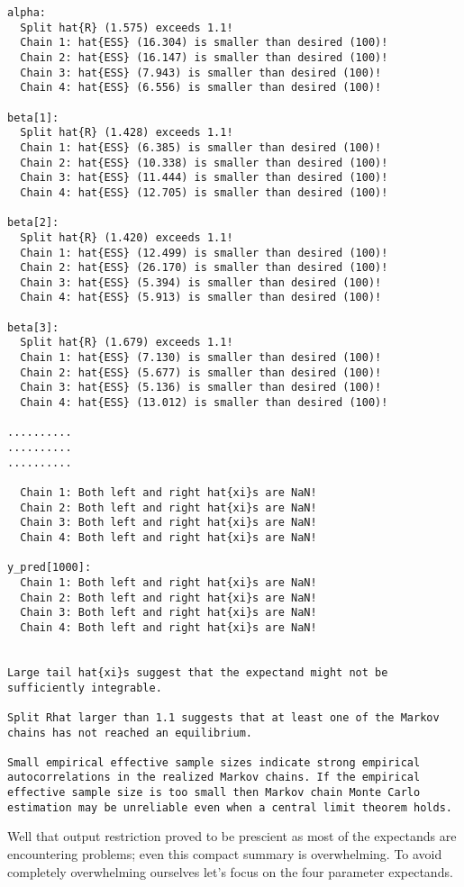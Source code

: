 \documentclass[
  letterpaper,
  DIV=11,
  numbers=noendperiod]{scrartcl}
\begin{document}
\begin{verbatim}
alpha:
  Split hat{R} (1.575) exceeds 1.1!
  Chain 1: hat{ESS} (16.304) is smaller than desired (100)!
  Chain 2: hat{ESS} (16.147) is smaller than desired (100)!
  Chain 3: hat{ESS} (7.943) is smaller than desired (100)!
  Chain 4: hat{ESS} (6.556) is smaller than desired (100)!

beta[1]:
  Split hat{R} (1.428) exceeds 1.1!
  Chain 1: hat{ESS} (6.385) is smaller than desired (100)!
  Chain 2: hat{ESS} (10.338) is smaller than desired (100)!
  Chain 3: hat{ESS} (11.444) is smaller than desired (100)!
  Chain 4: hat{ESS} (12.705) is smaller than desired (100)!

beta[2]:
  Split hat{R} (1.420) exceeds 1.1!
  Chain 1: hat{ESS} (12.499) is smaller than desired (100)!
  Chain 2: hat{ESS} (26.170) is smaller than desired (100)!
  Chain 3: hat{ESS} (5.394) is smaller than desired (100)!
  Chain 4: hat{ESS} (5.913) is smaller than desired (100)!

beta[3]:
  Split hat{R} (1.679) exceeds 1.1!
  Chain 1: hat{ESS} (7.130) is smaller than desired (100)!
  Chain 2: hat{ESS} (5.677) is smaller than desired (100)!
  Chain 3: hat{ESS} (5.136) is smaller than desired (100)!
  Chain 4: hat{ESS} (13.012) is smaller than desired (100)!

..........
..........
..........

  Chain 1: Both left and right hat{xi}s are NaN!
  Chain 2: Both left and right hat{xi}s are NaN!
  Chain 3: Both left and right hat{xi}s are NaN!
  Chain 4: Both left and right hat{xi}s are NaN!

y_pred[1000]:
  Chain 1: Both left and right hat{xi}s are NaN!
  Chain 2: Both left and right hat{xi}s are NaN!
  Chain 3: Both left and right hat{xi}s are NaN!
  Chain 4: Both left and right hat{xi}s are NaN!


Large tail hat{xi}s suggest that the expectand might not be
sufficiently integrable.

Split Rhat larger than 1.1 suggests that at least one of the Markov
chains has not reached an equilibrium.

Small empirical effective sample sizes indicate strong empirical
autocorrelations in the realized Markov chains. If the empirical
effective sample size is too small then Markov chain Monte Carlo
estimation may be unreliable even when a central limit theorem holds.
\end{verbatim}

Well that output restriction proved to be prescient as most of the
expectands are encountering problems; even this compact summary is
overwhelming. To avoid completely overwhelming ourselves let's focus on
the four parameter expectands.
\end{document}
